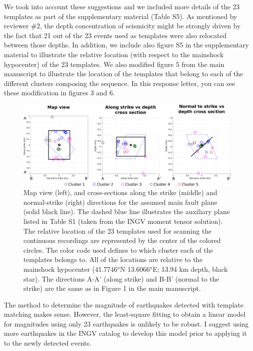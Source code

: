 \documentclass[10pt]{extarticle}
\begin{document}
\begin{Answer}
We took into account these suggestions and we included more details of the 23 templates as part of the supplementary material (Table S5). As mentioned by reviewer \#2, the depth concentration of seismicity might be strongly driven by the fact that 21 out of the 23 events used as templates were also relocated between those depths. In addition, we include also figure S5 in the supplementary material to illustrate the relative location (with respect to the mainshock hypocenter) of the 23 templates. We also modified figure 5 from the main manuscript to illustrate the location of the templates that belong to each of the different clusters composing the sequence. In this response letter, you can see these modification in figures 3 and 6.
\begin{figure}[!h]
\begin{center}
 \includegraphics[width=1\linewidth]{S6_templates_per_cluster_map.pdf} 
\end{center}
\caption{Map view (left), and cross-sections along the strike (middle) and normal-strike (right) directions for the assumed main fault plane (solid black line). The dashed blue line illustrates the auxiliary plane listed in Table S1 (taken from the INGV moment tensor solution). The relative location of the 23 templates used for scanning the continuous recordings are represented by the center of the colored circles. The color code used defines to which cluster each of the templates belongs to. All of the locations are relative to the mainshock hypocenter (41.7746$^o$N 13.6066$^o$E; 13.94 km depth, black star). The directions A-A' (along strike) and B-B' (normal to the strike) are the same as in Figure 1 in the main manuscript.}
\label{fig:S6_templates_map}
\end{figure}
 \WorkInProgressRevTask
\end{Answer}
%
%



\begin{ReviewerComment}{2}
\noindent 
The method to determine the magnitude of earthquakes detected with template matching makes sense. However, the least-square fitting to obtain a linear model for magnitudes using only 23 earthquakes is unlikely to be robust. I suggest using more earthquakes in the INGV catalog to develop this model prior to applying it to the newly detected events.
\end{ReviewerComment}
\end{document}
